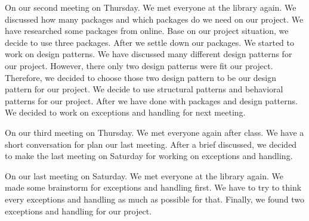 \documentclass[12pt]{article}
\begin{document}
\par
On our second meeting on Thursday. We met everyone at the library again. We discussed how many packages and which packages do we need on our project. We have researched some packages from online. Base on our project situation, we decide to use three packages. After we settle down our packages. We started to work on design patterns. We have discussed many different design patterns for our project. However, there only two design patterns were fit our project. Therefore, we decided to choose those two design pattern to be our design pattern for our project. We decide to use structural patterns and behavioral patterns for our project. After we have done with packages and design patterns. We decided to work on exceptions and handling for next meeting. \\

\par
On our third meeting on Thursday. We met everyone again after class. We have a short conversation for plan our last meeting. After a brief discussed, we decided to make the last meeting on Saturday for working on exceptions and handling. \\

\par
On our last meeting on Saturday. We met everyone at the library again. We made some brainstorm for exceptions and handling first. We have to try to think every exceptions and handling as much as possible for that. Finally, we found two exceptions and handling for our project. \\


\cite{rubtut}



\end{document}
